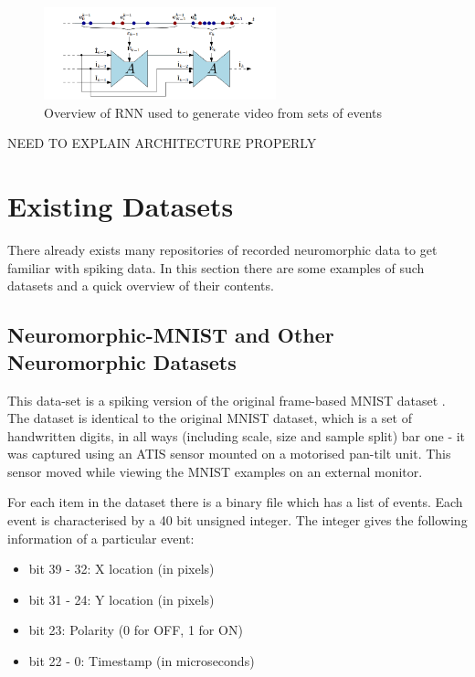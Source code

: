 \begin{figure}[htb]
      \centering
      \includegraphics[width=0.6\textwidth]{background/images/spikes_to_video_rnn.png}
      \caption{Overview of RNN used to generate video from sets of events\cite{spikingToVideo}}
      \label{fig:spikes_to_video_rnn}
\end{figure}

\color{red} NEED TO EXPLAIN ARCHITECTURE PROPERLY\cite{spikingToVideo} \color{black}

\section{Existing Datasets}

There already exists many repositories of recorded neuromorphic data to get familiar with spiking data. In this section there are some examples of such datasets and a quick overview of their contents.

\subsection{Neuromorphic-MNIST and Other Neuromorphic Datasets}

This data-set is a spiking version of the original frame-based MNIST dataset \cite{MNIST}\cite{NMNIST}. The dataset is identical to the original MNIST dataset, which is a set of handwritten digits, in all ways (including scale, size and sample split) bar one - it was captured using an ATIS sensor mounted on a motorised pan-tilt unit. This sensor moved while viewing the MNIST examples on an external monitor.

For each item in the dataset there is a binary file which has a list of events. Each event is characterised by a 40 bit unsigned integer. The integer gives the following information of a particular event:

\begin{itemize}
      \item bit 39 - 32: X location (in pixels)
      \item bit 31 - 24: Y location (in pixels)
      \item bit 23: Polarity (0 for OFF, 1 for ON)
      \item bit 22 - 0: Timestamp (in microseconds)
\end{itemize}

